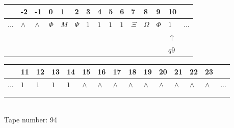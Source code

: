 \documentclass[11pt]{article}
\begin{document}
\begin{table}[H]
\centering
\begin{tabular}{lllllllllllllll}
 & -2 & -1 & 0 & 1 & 2 & 3 & 4 & 5 & 6 & 7 & 8 & 9 & 10 & \\
\hline
$...$ & \multicolumn{1}{|l|}{$\wedge$} & \multicolumn{1}{|l|}{$\wedge$} & \multicolumn{1}{|l|}{$\Phi$} & \multicolumn{1}{|l|}{$M$} & \multicolumn{1}{|l|}{$\Psi$} & \multicolumn{1}{|l|}{$1$} & \multicolumn{1}{|l|}{$1$} & \multicolumn{1}{|l|}{$1$} & \multicolumn{1}{|l|}{$1$} & \multicolumn{1}{|l|}{$\Xi$} & \multicolumn{1}{|l|}{$\Omega$} & \multicolumn{1}{|l|}{$\Phi$} & \multicolumn{1}{|l|}{$1$} & $...$\\
\hline
&  &  &  &  &  &  &  &  &  &  &  &  & $\uparrow$ &  \\
&  &  &  &  &  &  &  &  &  &  &  &  & $ q9 $ &  \\
\end{tabular}
\begin{tabular}{lllllllllllllll}
 & 11 & 12 & 13 & 14 & 15 & 16 & 17 & 18 & 19 & 20 & 21 & 22 & 23 & \\
\hline
$...$ & \multicolumn{1}{|l|}{$1$} & \multicolumn{1}{|l|}{$1$} & \multicolumn{1}{|l|}{$1$} & \multicolumn{1}{|l|}{$1$} & \multicolumn{1}{|l|}{$\wedge$} & \multicolumn{1}{|l|}{$\wedge$} & \multicolumn{1}{|l|}{$\wedge$} & \multicolumn{1}{|l|}{$\wedge$} & \multicolumn{1}{|l|}{$\wedge$} & \multicolumn{1}{|l|}{$\wedge$} & \multicolumn{1}{|l|}{$\wedge$} & \multicolumn{1}{|l|}{$\wedge$} & \multicolumn{1}{|l|}{$\wedge$} & $...$\\
\hline
&  &  &  &  &  &  &  &  &  &  &  &  &  &  \\
&  &  &  &  &  &  &  &  &  &  &  &  &  &  \\
\end{tabular}
\\
Tape number: 94
\noindent\makebox[\linewidth]{\hdashrule{\textwidth}{1pt}{1pt}}\end{table}
\end{document}
